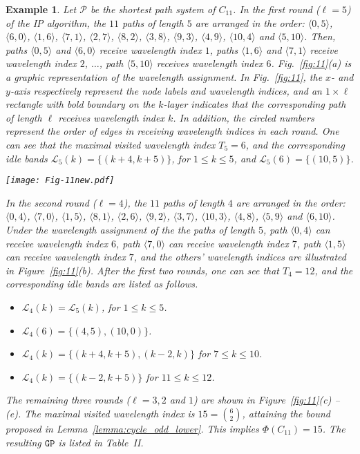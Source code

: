 \documentclass[journal,draftcls,onecolumn,12pt,twoside]{IEEEtran}
\newtheorem{example}{Example}
\newcommand{\GP}{{\mathtt{GP}}}
\begin{document}
\begin{example}
{\rm 
Let $\mathcal{P}$ be the shortest path system of $C_{11}$.
In the first round ($\ell=5$) of the IP algorithm, the $11$ paths of length $5$ are arranged in the order:  $\langle 0,5\rangle$, $\langle 6,0\rangle$, $\langle 1,6\rangle$, $\langle 7,1\rangle$, $\langle 2,7\rangle$, $\langle 8,2\rangle$, $\langle 3,8\rangle$, $\langle 9,3\rangle$, $\langle 4,9\rangle$, $\langle 10,4\rangle$ and $\langle 5,10\rangle$.
Then, paths $\langle 0,5\rangle$ and $\langle 6,0\rangle$ receive wavelength index $1$, paths $\langle 1,6\rangle$ and $\langle 7,1\rangle$ receive wavelength index $2$,  $\ldots$, path $\langle 5,10\rangle$ receives wavelength index $6$.
Fig.~\ref{fig:11}(a) is a graphic representation of the wavelength assignment.
In Fig.~\ref{fig:11}, the $x$- and $y$-axis respectively represent the node labels and wavelength indices, and an $1\times\ell$ rectangle with bold boundary on the $k$-layer indicates that the corresponding path of length $\ell$ receives wavelength index $k$.
In addition, the circled numbers represent the order of edges in receiving wavelength indices in each round.
One can see that the maximal visited wavelength index $T_5=6$, and the corresponding idle bands $\mathcal{L}_5(k)=\{(k+4,k+5)\}$, for $1\leq k\leq 5$, and $\mathcal{L}_5(6)=\{(10,5)\}$.

\begin{figure*}\centering
\texttt{[image: Fig-11new.pdf]}
\caption{A round-by-round illustration of Algorithm~\ref{alg:GGP} for $n=5$.} \label{fig:11}
\end{figure*}

In the second round ($\ell=4$), the $11$ paths of length $4$ are arranged in the order:  $\langle 0,4\rangle$, $\langle 7,0\rangle$, $\langle 1,5\rangle$, $\langle 8,1\rangle$, $\langle 2,6\rangle$, $\langle 9,2\rangle$, $\langle 3,7\rangle$, $\langle 10,3\rangle$, $\langle 4,8\rangle$, $\langle 5,9\rangle$ and $\langle 6,10\rangle$.
Under the wavelength assignment of the the paths of length $5$, path $\langle 0,4\rangle$ can receive wavelength index $6$, path $\langle 7,0\rangle$ can receive wavelength index $7$, path $\langle 1,5\rangle$ can receive wavelength index $7$, and the others' wavelength indices are illustrated in Figure~\ref{fig:11}(b).
After the first two rounds, one can see that $T_4=12$, and the corresponding idle bands are listed as follows.
\begin{itemize}
\item $\mathcal{L}_4(k)=\mathcal{L}_5(k)$, for $1\leq k\leq5$.
\item $\mathcal{L}_4(6)=\{(4,5),(10,0)\}$.
\item $\mathcal{L}_4(k)=\{(k+4,k+5),(k-2,k)\}$ for $7\leq k\leq10$.
\item $\mathcal{L}_4(k)=\{(k-2,k+5)\}$ for $11\leq k\leq 12$.
\end{itemize}
The remaining three rounds ($\ell=3,2$ and $1$) are shown in Figure~\ref{fig:11}(c) -- (e).
The maximal visited wavelength index is $15={6\choose 2}$, attaining the bound proposed in Lemma~\ref{lemma:cycle_odd_lower}.
This implies $\Phi(C_{11})=15$.
The resulting $\GP$ is listed in Table~II.  }
\end{example}
\end{document}
